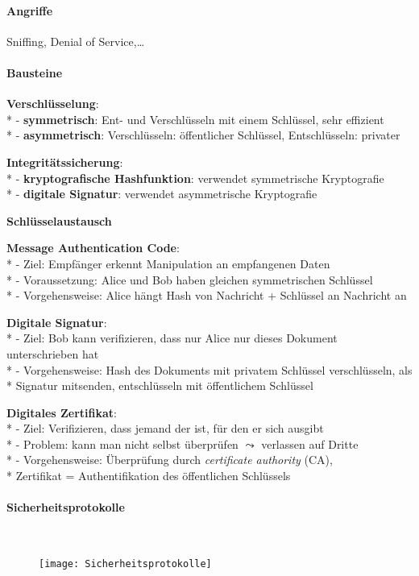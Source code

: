 \paragraph{Angriffe}
\begin{items}
  \item Sniffing, Denial of Service,\dots
\end{items}

\paragraph{Bausteine}
\begin{items}
  \item \textbf{Verschlüsselung}: \\*
    - \textbf{symmetrisch}: Ent- und Verschlüsseln mit einem Schlüssel, sehr effizient \\*
    - \textbf{asymmetrisch}: Verschlüsseln: öffentlicher Schlüssel, Entschlüsseln: privater
  \item \textbf{Integritätssicherung}: \\*
    - \textbf{kryptografische Hashfunktion}: verwendet symmetrische Kryptografie \\*
    - \textbf{digitale Signatur}: verwendet asymmetrische Kryptografie
  \item \textbf{Schlüsselaustausch}
  \item \textbf{Message Authentication Code}: \\*
    - Ziel: Empfänger erkennt Manipulation an empfangenen Daten \\*
    - Voraussetzung: Alice und Bob haben gleichen symmetrischen Schlüssel \\*
    - Vorgehensweise: Alice hängt Hash von Nachricht + Schlüssel an Nachricht an
  \item \textbf{Digitale Signatur}: \\*
    - Ziel: Bob kann verifizieren, dass nur Alice nur dieses Dokument unterschrieben hat \\*
    - Vorgehensweise: Hash des Dokuments mit privatem Schlüssel verschlüsseln, als \\* \phantom{-} Signatur mitsenden, entschlüsseln mit öffentlichem Schlüssel
  \item \textbf{Digitales Zertifikat}: \\*
    - Ziel: Verifizieren, dass jemand der ist, für den er sich ausgibt \\*
    - Problem: kann man nicht selbst überprüfen \( \leadsto \) verlassen auf Dritte \\*
    - Vorgehensweise: Überprüfung durch \emph{certificate authority} (CA), \\* \phantom{-} Zertifikat = Authentifikation des öffentlichen Schlüssels
\end{items}

\paragraph{Sicherheitsprotokolle}
\
\begin{figure}[H]\centering\label{Sicherheitsprotokolle}\texttt{[image: Sicherheitsprotokolle]}\end{figure}
